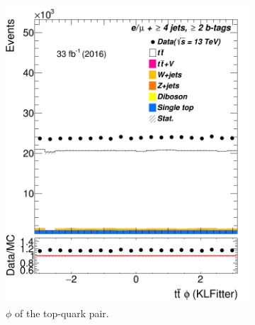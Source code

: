\begin{figure}
\begin{subfigure}{0.35\textwidth}
		\includegraphics[width=\linewidth]{ControlPlots_emujets_2016_4incl_2incl/klf_ttbar_phi_emujets_2016.png}
		\caption{$\phi$ of the top-quark pair.} \label{fig:32}
	\end{subfigure}
	\medskip
	\begin{subfigure}{0.35\textwidth}

\end{subfigure}
\end{figure}
